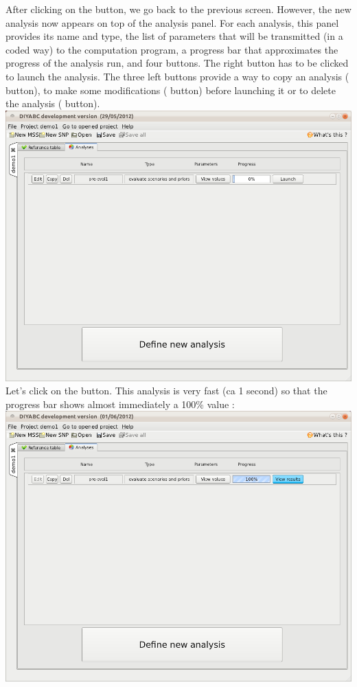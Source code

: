 After clicking on the  button, we go back to the previous screen. However, the new analysis now appears on top of the analysis panel. For each analysis, this panel provides its name and type, the list of parameters that will be transmitted (in a coded way) to the computation program, a progress bar that approximates the progress of the analysis run, and four buttons. The right button has to be clicked to launch the analysis. The three left buttons provide a way to copy an analysis ( button), to make some modifications ( button) before launching it or to delete the analysis ( button).\\
 

\includegraphics[scale=0.35]{gui_pictures/Capture-DIYABC-30.png} \\

Let's click on the  button. This analysis is very fast (ca 1 second) so that the progress bar shows almost immediately a 100\% value : \\

\includegraphics[scale=0.35]{gui_pictures/Capture-DIYABC-31.png} \\

